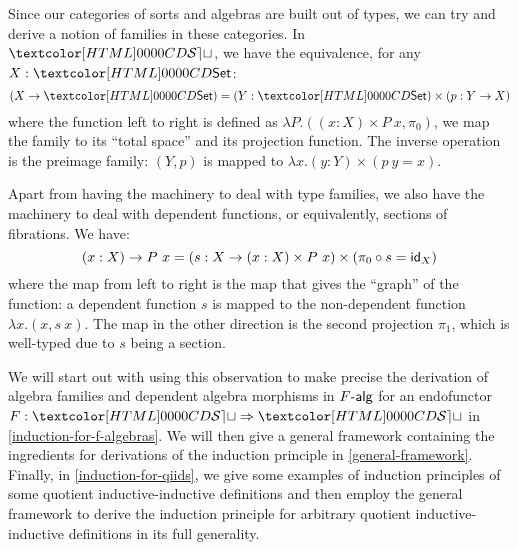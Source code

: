 Since our categories of sorts and algebras are built out of types, we
can try and derive a notion of families in these categories. In
$\SET$, we have the equivalence, for any $X : \Set$:
$$
(X \to \Set) = (Y : \Set) \times (p : Y \to X)
$$
where the function left to right is defined as
$\lambda P . ((x : X) \times P\ x , \pi_0)$, \ie we map the family to
its ``total space'' and its projection function. The inverse operation
is the preimage family: $(Y,p)$ is mapped to
$\lambda x . (y : Y) \times (p\ y = x)$. 

Apart from having the machinery to deal with type families, we also
have the machinery to deal with dependent functions, or equivalently,
sections of fibrations. We have:
$$
(x : X) \to P\ x = (s : X \to (x : X) \times P\ x) \times (\pi_0 \circ s = \id_{X})
$$
where the map from left to right is the map that gives the ``graph''
of the function: a dependent function $s$ is mapped to the
non-dependent function $\lambda x . (x , s\ x)$. The map in the other
direction is the second projection $\pi_1$, which is well-typed due to
$s$ being a section.

We will start out with using this observation to make precise the
derivation of algebra families and dependent algebra morphisms in
$\algcat{F}$ for an endofunctor $F : \Func{\SET}{\SET}$ in
\cref{induction-for-f-algebras}. We will then give a general framework
containing the ingredients for derivations of the induction principle
in \cref{general-framework}. Finally, in \cref{induction-for-qiids},
we give some examples of induction principles of some quotient
inductive-inductive definitions and then employ the general framework
to derive the induction principle for arbitrary quotient
inductive-inductive definitions in its full generality.

